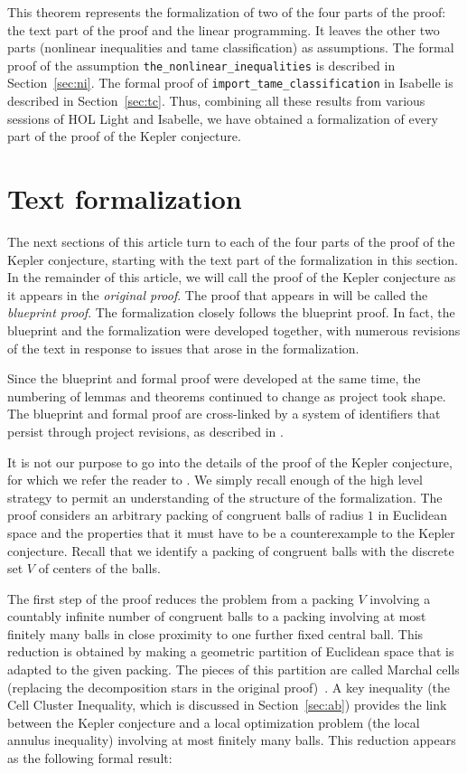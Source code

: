 This theorem represents the formalization of two of the four parts of
the proof: the text part of the proof and the linear programming.  It
leaves the other two parts (nonlinear inequalities and tame
classification) as assumptions.  The formal proof of the assumption
\verb!the_nonlinear_inequalities! is described in
Section~\ref{sec:ni}.  The formal proof of
\verb!import_tame_classification! in Isabelle is described in
Section~\ref{sec:tc}.  Thus, combining all these results from various
sessions of HOL Light and Isabelle, we have obtained a formalization
of every part of the proof of the Kepler conjecture.





\section{Text formalization}\label{sec:tf}


The next sections of this article turn to each of the four parts of
the proof of the Kepler conjecture, starting with the text part of the
formalization in this section.  In the remainder of this article, we
will call the proof of the Kepler conjecture as it appears in
\cite{Hales:2006:DCG} the {\it original proof}.
The proof that appears in \cite{DSP} will be called the {\it blueprint
  proof}.  The formalization closely follows the blueprint proof.  In
fact, the blueprint and the formalization were developed together, with
numerous revisions of the text in response to issues that arose in the
formalization.

Since the blueprint and formal proof were developed at the same time,
the numbering of lemmas and theorems continued to change as project
took shape.  The blueprint and formal proof are cross-linked by a
system of identifiers that persist through project revisions, as
described in \cite[]{FlyspeckWiki}.

It is not our purpose to go into the details of the proof of the
Kepler conjecture, for which we refer the reader to \cite{DSP}.  We
simply recall enough of the high level strategy to permit an
understanding of the structure of the formalization.  The proof
considers an arbitrary packing of congruent balls of radius $1$ in
Euclidean space and the properties that it must have to be a
counterexample to the Kepler conjecture.  Recall that we identify a
packing of congruent balls with the discrete set $V$ of centers of the
balls.

The first step of the proof reduces the problem from a packing $V$
involving a countably infinite number of congruent balls to a packing
involving at most finitely many balls in close proximity to one further
fixed central ball.  This reduction is obtained by making a geometric
partition of Euclidean space that is adapted to the given packing.
The pieces of this partition are called Marchal cells (replacing the
decomposition stars in the original proof)~\cite{Marchal11}.  A key
inequality (the Cell Cluster Inequality, which is discussed in
Section~\ref{sec:ab}) provides the link between the Kepler conjecture
and a local optimization problem (the local annulus inequality)
involving at most finitely many balls.  This reduction appears as the
following formal result:

